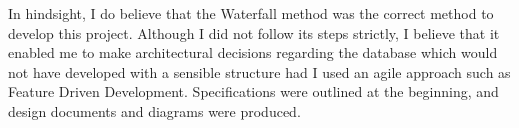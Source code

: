 In hindsight, I do believe that the Waterfall method was the correct method to develop this project. Although I did not follow its steps strictly, I believe that it enabled me to make architectural decisions regarding the database which would not have developed with a sensible structure had I used an agile approach such as Feature Driven Development. Specifications were outlined at the beginning, and design documents and diagrams were produced. 
